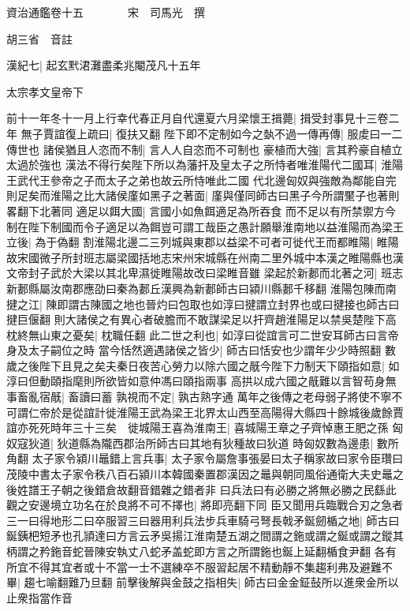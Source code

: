 資治通鑑卷十五　　　　宋　司馬光　撰

胡三省　音註

漢紀七|{
	起玄黓涒灘盡柔兆閹茂凡十五年}


太宗孝文皇帝下

前十一年冬十一月上行幸代春正月自代還夏六月梁懷王揖薨|{
	揖受封事見十三卷二年}
無子賈誼復上疏曰|{
	復扶又翻}
陛下即不定制如今之埶不過一傳再傳|{
	服䖍曰一二傳世也}
諸侯猶且人恣而不制|{
	言人人自恣而不可制也}
豪植而大強|{
	言其矜豪自植立太過於強也}
漢法不得行矣陛下所以為藩扞及皇太子之所恃者唯淮陽代二國耳|{
	淮陽王武代王參帝之子而太子之弟也故云所恃唯此二國}
代北邊匈奴與強敵為鄰能自完則足矣而淮陽之比大諸侯廑如黑子之著面|{
	廑與僅同師古曰黑子今所謂黶子也著則畧翻下北著同}
適足以餌大國|{
	言國小如魚餌適足為所吞食}
而不足以有所禁禦方今制在陛下制國而令子適足以為餌豈可謂工哉臣之愚計願舉淮南地以益淮陽而為梁王立後|{
	為于偽翻}
割淮陽北邊二三列城與東郡以益梁不可者可徙代王而都睢陽|{
	睢陽故宋國微子所封班志屬梁國括地志宋州宋城縣在州南二里外城中本漢之睢陽縣也漢文帝封子武於大梁以其北卑濕徙睢陽故改曰梁睢音雖}
梁起於新郪而北著之河|{
	班志新郪縣屬汝南郡應劭曰秦為郪丘漢興為新郪師古曰潁川縣郪千移翻}
淮陽包陳而南揵之江|{
	陳即謂古陳國之地也晉灼曰包取也如淳曰揵謂立封界也或曰揵接也師古曰揵巨偃翻}
則大諸侯之有異心者破膽而不敢謀梁足以扞齊趙淮陽足以禁吳楚陛下高枕終無山東之憂矣|{
	枕職任翻}
此二世之利也|{
	如淳曰從誼言可二世安耳師古曰言帝身及太子嗣位之時}
當今恬然適遇諸侯之皆少|{
	師古曰恬安也少謂年少少時照翻}
數歲之後陛下且見之矣夫秦日夜苦心勞力以除六國之旤今陛下力制天下頤指如意|{
	如淳曰但動頤指麾則所欲皆如意仲馮曰頤指兩事}
高拱以成六國之旤難以言智苟身無事畜亂宿旤|{
	畜讀曰蓄}
孰視而不定|{
	孰古熟字通}
萬年之後傳之老母弱子將使不寧不可謂仁帝於是從誼計徙淮陽王武為梁王北界太山西至高陽得大縣四十餘城後歲餘賈誼亦死死時年三十三矣　徙城陽王喜為淮南王|{
	喜城陽王章之子齊悼惠王肥之孫}
匈奴寇狄道|{
	狄道縣為隴西郡治所師古曰其地有狄種故曰狄道}
時匈奴數為邊患|{
	數所角翻}
太子家令潁川鼂錯上言兵事|{
	太子家令屬詹事張晏曰太子稱家故曰家令臣瓚曰茂陵中書太子家令秩八百石潁川本韓國秦置郡漢因之鼂與朝同風俗通衛大夫史鼂之後姓譜王子朝之後錯倉故翻音錯雜之錯者非}
曰兵法曰有必勝之將無必勝之民繇此觀之安邊境立功名在於良將不可不擇也|{
	將即亮翻下同}
臣又聞用兵臨戰合刃之急者三一曰得地形二曰卒服習三曰器用利兵法步兵車騎弓弩長戟矛鋋劒楯之地|{
	師古曰鋋銕杷短矛也孔頴達曰方言云矛吳揚江淮南楚五湖之間謂之鉇或謂之鋋或謂之鏦其柄謂之矜鉇音蛇晉陳安執丈八蛇矛盖蛇即方言之所謂鉇也鋋上延翻楯食尹翻}
各有所宜不得其宜者或十不當一士不選練卒不服習起居不精動靜不集趨利弗及避難不畢|{
	趨七喻翻難乃旦翻}
前擊後解與金鼓之指相失|{
	師古曰金金鉦鼔所以進衆金所以止衆指當作音}
